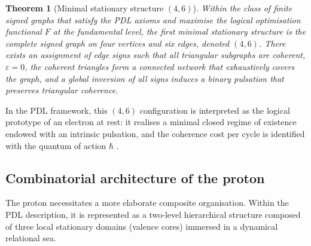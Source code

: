 \documentclass[11pt,a4paper]{article}
\theoremstyle{plain}
\newtheorem{theorem}{Theorem}
\theoremstyle{definition}
\theoremstyle{remark}
\begin{document}
\begin{theorem}[Minimal stationary structure \texorpdfstring{\((4,6)\)}{(4,6)}]
  \label{thm:46_minimal}
  Within the class of finite signed graphs that satisfy the PDL axioms and maximise the logical optimisation functional \(F\) at the fundamental level, the first minimal stationary structure is the complete signed graph on four vertices and six edges, denoted \((4,6)\). There exists an assignment of edge signs such that all triangular subgraphs are coherent, \(\varepsilon = 0\), the coherent triangles form a connected network that exhaustively covers the graph, and a global inversion of all signs induces a binary pulsation that preserves triangular coherence.
\end{theorem}

In the PDL framework, this \((4,6)\) configuration is interpreted as the logical prototype of an electron at rest: it realises a minimal closed regime of existence endowed with an intrinsic pulsation, and the coherence cost per cycle is identified with the quantum of action \(\hbar\) \cite{Laubscher2026PDL_English,Laubscher2026LDP_French}.

\subsection{Combinatorial architecture of the proton}

The proton necessitates a more elaborate composite organisation. Within the PDL description, it is represented as a two-level hierarchical structure composed of three local stationary domains (valence cores) immersed in a dynamical relational sea.
\end{document}
